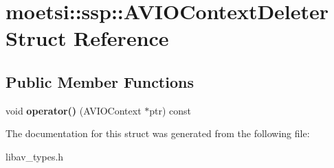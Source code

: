 \hypertarget{structmoetsi_1_1ssp_1_1AVIOContextDeleter}{}\section{moetsi\+:\+:ssp\+:\+:A\+V\+I\+O\+Context\+Deleter Struct Reference}
\label{structmoetsi_1_1ssp_1_1AVIOContextDeleter}
\subsection*{Public Member Functions}
\begin{DoxyCompactItemize}
\item 
\mbox{\label{structmoetsi_1_1ssp_1_1AVIOContextDeleter_a9eef3f789c5354a06b27d2e58e1ecba1}} 
void {\bfseries operator()} (A\+V\+I\+O\+Context $\ast$ptr) const
\end{DoxyCompactItemize}


The documentation for this struct was generated from the following file\+:\begin{DoxyCompactItemize}
\item 
libav\+\_\+types.\+h\end{DoxyCompactItemize}
